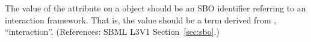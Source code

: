 The value of the attribute  on a \Reaction object should be
an SBO identifier referring to an interaction framework.  That is, the
value should be a term derived from \sbointeractionID, ``interaction''.
(References: SBML L3V1 Section~\ref{sec:sbo}.)

